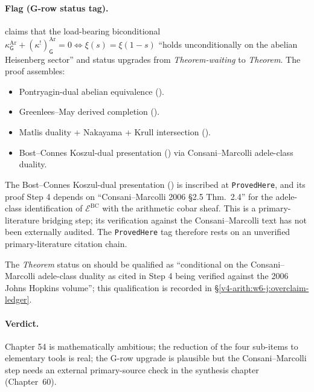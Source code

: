 \paragraph{Flag (G-row status tag).}
 claims that the
load-bearing biconditional
\(\kappa^{\mathrm{Ar}}_{\mathsf{G}}+(\kappa^{!})^{\mathrm{Ar}}_{\mathsf{G}}=0\Leftrightarrow\xi(s)=\xi(1-s)\)
``holds unconditionally on the abelian Heisenberg sector'' and
status upgrades from \emph{Theorem-waiting} to \emph{Theorem}. The
proof assembles:
\begin{itemize}
\item Pontryagin-dual abelian equivalence ().
\item Greenlees--May derived completion ().
\item Matlis duality + Nakayama + Krull intersection
().
\item Bost--Connes Koszul-dual presentation
() via Consani--Marcolli
adele-class duality.
\end{itemize}
The Bost--Connes Koszul-dual presentation
() is inscribed at
\texttt{ProvedHere}, and its proof Step 4 depends on
``Consani--Marcolli 2006 \S 2.5 Thm.~2.4'' for the adele-class
identification of \(\mathcal{E}^{\mathrm{BC}}\) with the arithmetic
cobar sheaf. This is a primary-literature bridging step; its
verification against the Consani--Marcolli text has not been
externally audited. The \texttt{ProvedHere} tag therefore rests on
an unverified primary-literature citation chain.

The \emph{Theorem} status on
 should be
qualified as ``conditional on the Consani--Marcolli adele-class
duality as cited in  Step 4
being verified against the 2006 Johns Hopkins volume''; this
qualification is recorded in \S\ref{v4-arith:w6-j:overclaim-ledger}.

\paragraph{Verdict.} Chapter 54 is mathematically ambitious; the
reduction of the four sub-items to elementary tools is real; the
G-row upgrade is plausible but the Consani--Marcolli step needs an
external primary-source check in the synthesis chapter (Chapter~60).

